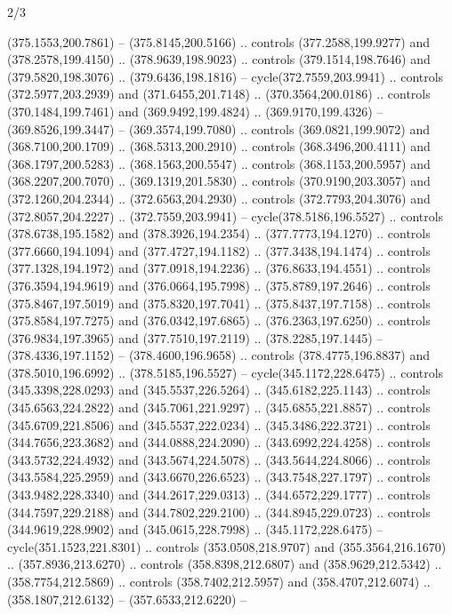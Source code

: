 \begin{flagdescription}{2/3}
\begin{scope}[xshift=0.5\flaglength,yshift=0.5\flagwidth,scale=\flagwidth/495.65]
\begin{scope}[y=0.8pt, x=0.8pt, yscale=-1,shift={(-463.76,-309.78)}]
  (375.1553,200.7861) -- (375.8145,200.5166) .. controls (377.2588,199.9277) and
  (378.2578,199.4150) .. (378.9639,198.9023) .. controls (379.1514,198.7646) and
  (379.5820,198.3076) .. (379.6436,198.1816) -- cycle(372.7559,203.9941) ..
  controls (372.5977,203.2939) and (371.6455,201.7148) .. (370.3564,200.0186) ..
  controls (370.1484,199.7461) and (369.9492,199.4824) .. (369.9170,199.4326) --
  (369.8526,199.3447) -- (369.3574,199.7080) .. controls (369.0821,199.9072) and
  (368.7100,200.1709) .. (368.5313,200.2910) .. controls (368.3496,200.4111) and
  (368.1797,200.5283) .. (368.1563,200.5547) .. controls (368.1153,200.5957) and
  (368.2207,200.7070) .. (369.1319,201.5830) .. controls (370.9190,203.3057) and
  (372.1260,204.2344) .. (372.6563,204.2930) .. controls (372.7793,204.3076) and
  (372.8057,204.2227) .. (372.7559,203.9941) -- cycle(378.5186,196.5527) ..
  controls (378.6738,195.1582) and (378.3926,194.2354) .. (377.7773,194.1270) ..
  controls (377.6660,194.1094) and (377.4727,194.1182) .. (377.3438,194.1474) ..
  controls (377.1328,194.1972) and (377.0918,194.2236) .. (376.8633,194.4551) ..
  controls (376.3594,194.9619) and (376.0664,195.7998) .. (375.8789,197.2646) ..
  controls (375.8467,197.5019) and (375.8320,197.7041) .. (375.8437,197.7158) ..
  controls (375.8584,197.7275) and (376.0342,197.6865) .. (376.2363,197.6250) ..
  controls (376.9834,197.3965) and (377.7510,197.2119) .. (378.2285,197.1445) --
  (378.4336,197.1152) -- (378.4600,196.9658) .. controls (378.4775,196.8837) and
  (378.5010,196.6992) .. (378.5185,196.5527) -- cycle(345.1172,228.6475) ..
  controls (345.3398,228.0293) and (345.5537,226.5264) .. (345.6182,225.1143) ..
  controls (345.6563,224.2822) and (345.7061,221.9297) .. (345.6855,221.8857) ..
  controls (345.6709,221.8506) and (345.5537,222.0234) .. (345.3486,222.3721) ..
  controls (344.7656,223.3682) and (344.0888,224.2090) .. (343.6992,224.4258) ..
  controls (343.5732,224.4932) and (343.5674,224.5078) .. (343.5644,224.8066) ..
  controls (343.5584,225.2959) and (343.6670,226.6523) .. (343.7548,227.1797) ..
  controls (343.9482,228.3340) and (344.2617,229.0313) .. (344.6572,229.1777) ..
  controls (344.7597,229.2188) and (344.7802,229.2100) .. (344.8945,229.0723) ..
  controls (344.9619,228.9902) and (345.0615,228.7998) .. (345.1172,228.6475) --
  cycle(351.1523,221.8301) .. controls (353.0508,218.9707) and
  (355.3564,216.1670) .. (357.8936,213.6270) .. controls (358.8398,212.6807) and
  (358.9629,212.5342) .. (358.7754,212.5869) .. controls (358.7402,212.5957) and
  (358.4707,212.6074) .. (358.1807,212.6132) -- (357.6533,212.6220) --

\end{scope}
\end{scope}
\end{flagdescription}

